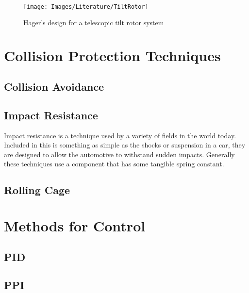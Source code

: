 	\begin{figure}[H]
	\centering
	\texttt{[image: Images/Literature/TiltRotor]}     
	\caption{Hager's design for a telescopic tilt rotor system \cite{Heli}}
	\label{IM_TiltRotor}
	\end{figure}

\section{Collision Protection Techniques}
	\cite{Klaptocz2013, Collision, Klaptocz2012, Briod2012, Daler2013, Klaptocz2010}
	\subsection{Collision Avoidance}
	\subsection{Impact Resistance}
	Impact resistance is a technique used by a variety of fields in the world today. Included in this is something as simple as the shocks or suspension in a car, they are designed to allow the automotive to withstand sudden impacts. Generally these techniques use a component that has some tangible spring constant.
	
	
	\subsection{Rolling Cage}
	
\section{Methods for Control}
	
	\subsection{PID}
	\subsection{PPI}
